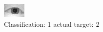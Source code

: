 \begin{figure}[h!]
\begin{center}
\includegraphics[width=0.60\columnwidth]{figures/ID885_class_1_target_2.png}
\end{center}
\caption{ Classification: 1 actual target: 2}
\label{fig:ID885_class_1_target_2}
\end{figure}
